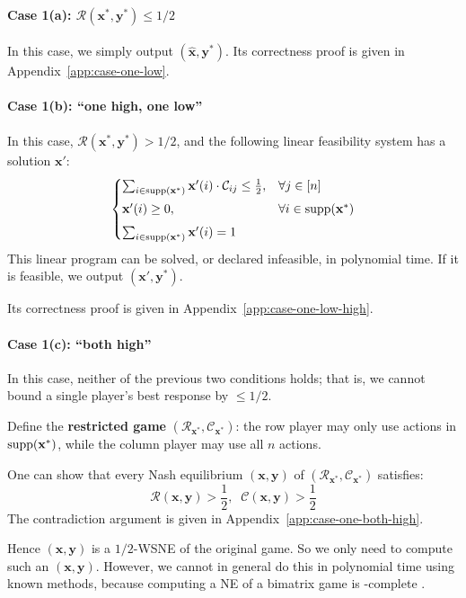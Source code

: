 \paragraph{Case 1(a): \(\mathcal{R}(\mathbf{x}^*, \mathbf{y}^*) \le 1/2\)}
In this case, we simply output \((\hat{\mathbf{x}}, \mathbf{y}^*)\). Its correctness proof is given in Appendix~\ref{app:case-one-low}.

\paragraph{Case 1(b): ``one high, one low''}
In this case, \(\mathcal{R}(\mathbf{x}^*, \mathbf{y}^*) > 1/2\), and the following linear feasibility system has a solution \(\mathbf{x}'\):
\[
  \begin{cases}
    \sum_{i \in \operatorname{supp}(\mathbf{x}^*)} \mathbf{x}'(i) \cdot \mathcal{C}_{ij} \le \frac12, & \forall j \in [n]                 \\[4pt]
    \mathbf{x}'(i) \ge 0,                                                               & \forall i \in \operatorname{supp}(\mathbf{x}^*) \\[4pt]
    \sum_{i \in \operatorname{supp}(\mathbf{x}^*)} \mathbf{x}'(i) = 1
  \end{cases}
\]
This linear program can be solved, or declared infeasible, in polynomial time.
If it is feasible, we output \((\mathbf{x}', \mathbf{y}^*)\).

Its correctness proof is given in Appendix~\ref{app:case-one-low-high}.

\paragraph{Case 1(c): ``both high''}
In this case, neither of the previous two conditions holds; that is, we cannot bound a single player's best response by \(\le 1/2\).

Define the \textbf{restricted game} \((\mathcal{R}_{\mathbf{x}^*}, \mathcal{C}_{\mathbf{x}^*})\): the row player may only use actions in \(\operatorname{supp}(\mathbf{x}^*)\), while the column player may use all \(n\) actions.

One can show that every Nash equilibrium \((\mathbf{x}, \mathbf{y})\) of \((\mathcal{R}_{\mathbf{x}^*}, \mathcal{C}_{\mathbf{x}^*})\) satisfies:
\[
  \mathcal{R}(\mathbf{x}, \mathbf{y}) > \frac12,\;\; \mathcal{C}(\mathbf{x}, \mathbf{y}) > \frac12
\]
The contradiction argument is given in Appendix~\ref{app:case-one-both-high}.

Hence \((\mathbf{x}, \mathbf{y})\) is a \(1/2\)-WSNE of the original game. So we only need to compute such an \((\mathbf{x}, \mathbf{y})\). However, we cannot in general do this in polynomial time using known methods, because computing a NE of a bimatrix game is \PPAD-complete \cite{DGP09}.

